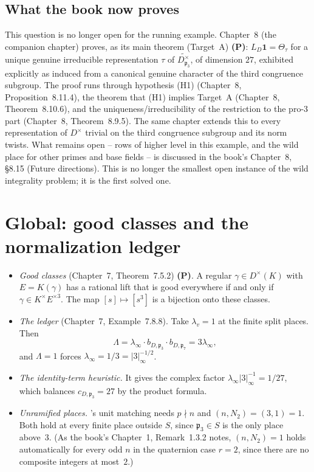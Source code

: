 \documentclass[11pt]{article}
\newcommand{\p}{\mathfrak p}
\newcommand{\Ptag}{\textbf{(P)}}
\theoremstyle{definition}
\begin{document}
\subsection*{What the book now proves}
This question is no longer open for the running example. Chapter~8
(the companion chapter) proves, as its main theorem (Target~A) \Ptag:
$L_D\mathbf1=\Theta_\tau$ for a unique
genuine irreducible representation $\tau$ of $\widetilde{D_{\p_3}^\times}$,
of dimension $27$, exhibited explicitly as induced from a canonical
genuine character of the third congruence subgroup. The proof runs
through hypothesis (H1) (Chapter~8, Proposition~8.11.4), the theorem
that (H1) implies Target~A (Chapter~8, Theorem~8.10.6), and the
uniqueness/irreducibility of the restriction to the pro-$3$ part
(Chapter~8, Theorem~8.9.5). The same chapter extends this to every
representation of $D^\times$ trivial on the third congruence subgroup
and its norm twists. What remains open -- rows of higher level in
this example, and the wild place for other primes and base fields --
is discussed in the book's Chapter~8, \S8.15 (Future directions).
This is no longer the smallest open instance of the wild integrality
problem; it is the first solved one.

\section{Global: good classes and the normalization ledger}
\begin{itemize}
\item \emph{Good classes} (Chapter~7, Theorem~7.5.2) \Ptag. A regular
$\gamma\in D^\times(K)$ with $E=K(\gamma)$ has a rational lift that is
good everywhere if and only if $\gamma\in K^\times E^{\times3}$. The map
$[s]\mapsto[s^3]$ is a bijection onto these classes.
\item \emph{The ledger} (Chapter~7, Example~7.8.8). Take $\lambda_v=1$ at the
finite split places. Then
\[
\Lambda=\lambda_\infty\cdot b_{D,\p_3}\cdot b_{D,\p_7}=3\lambda_\infty,
\]
and $\Lambda=1$ forces $\lambda_\infty=1/3=|3|_\infty^{-1/2}$.
\item \emph{The identity-term heuristic.} It gives the complex factor
$\lambda_\infty|3|_\infty^{-1}=1/27$, which balances $c_{D,\p_3}=27$ by
the product formula.
\item \emph{Unramified places.} \cite{FK86}'s unit matching needs $p\nmid n$ and
$(n,N_2)=(3,1)=1$. Both hold at every finite place outside $S$, since $\p_3\in S$
is the only place above~$3$. (As the book's Chapter~1, Remark~1.3.2
notes, $(n,N_2)=1$ holds automatically for every odd $n$ in the
quaternion case $r=2$, since there are no composite integers at
most~$2$.)
\end{itemize}
\end{document}
